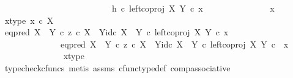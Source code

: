 \begin{isabellebody}
\ \ \ \ \ \ \ \ \ \ \ \ \ \ \ \ \ \ \ \ \ \ \ \ \ \ {\isacharparenleft}{\kern0pt}h\ {\isasymcirc}\isactrlsub c\ left{\isacharunderscore}{\kern0pt}coproj\ X\ Y{\isacharparenright}{\kern0pt}\ {\isasymcirc}\isactrlsub c\ x{\isachardoublequoteclose}\isanewline
\ \ \ \ \isamarkupfalse%
\ {\isacharminus}{\kern0pt}\ \isanewline
\ \ \ \ \ \ \isamarkupfalse%
\ x\isanewline
\ \ \ \ \ \ \isamarkupfalse%
\ x{\isacharunderscore}{\kern0pt}type{\isacharcolon}{\kern0pt}\ {\isachardoublequoteopen}x\ {\isasymin}\isactrlsub c\ X{\isachardoublequoteclose}\isanewline
\ \ \ \ \ \ \isamarkupfalse%
\ {\isachardoublequoteopen}{\isacharparenleft}{\kern0pt}{\isacharparenleft}{\kern0pt}eq{\isacharunderscore}{\kern0pt}pred\ {\isacharparenleft}{\kern0pt}X\ {\isasymCoprod}\ Y{\isacharparenright}{\kern0pt}\ {\isasymcirc}\isactrlsub c\ {\isasymlangle}z\ {\isasymcirc}\isactrlsub c\ {\isasymbeta}\isactrlbsub X\ {\isasymCoprod}\ Y\isactrlesub {\isacharcomma}{\kern0pt}id\isactrlsub c\ {\isacharparenleft}{\kern0pt}X\ {\isasymCoprod}\ Y{\isacharparenright}{\kern0pt}{\isasymrangle}{\isacharparenright}{\kern0pt}\ {\isasymcirc}\isactrlsub c\ left{\isacharunderscore}{\kern0pt}coproj\ X\ Y{\isacharparenright}{\kern0pt}\ {\isasymcirc}\isactrlsub c\ x\ {\isacharequal}{\kern0pt}\ \isanewline
\ \ \ \ \ \ \ \ \ \ \ \ \ \ eq{\isacharunderscore}{\kern0pt}pred\ {\isacharparenleft}{\kern0pt}X\ {\isasymCoprod}\ Y{\isacharparenright}{\kern0pt}\ {\isasymcirc}\isactrlsub c\ {\isasymlangle}z\ {\isasymcirc}\isactrlsub c\ {\isasymbeta}\isactrlbsub X\ {\isasymCoprod}\ Y\isactrlesub {\isacharcomma}{\kern0pt}id\isactrlsub c\ {\isacharparenleft}{\kern0pt}X\ {\isasymCoprod}\ Y{\isacharparenright}{\kern0pt}{\isasymrangle}\ {\isasymcirc}\isactrlsub c\ {\isacharparenleft}{\kern0pt}left{\isacharunderscore}{\kern0pt}coproj\ X\ Y\ {\isasymcirc}\isactrlsub c\ \ x{\isacharparenright}{\kern0pt}{\isachardoublequoteclose}\isanewline
\ \ \ \ \ \ \ \ \ \ \ \ \ \isamarkupfalse%
\ x{\isacharunderscore}{\kern0pt}type\ \isamarkupfalse%
\ {\isacharparenleft}{\kern0pt}typecheck{\isacharunderscore}{\kern0pt}cfuncs{\isacharcomma}{\kern0pt}\ metis\ assms\ cfunc{\isacharunderscore}{\kern0pt}type{\isacharunderscore}{\kern0pt}def\ comp{\isacharunderscore}{\kern0pt}associative{\isacharparenright}{\kern0pt}\isanewline
\ \ \ \ \ \ \isamarkupfalse%
\ \isamarkupfalse%
\ {\isachardoublequoteopen}{\isachardot}{\kern0pt}{\isachardot}{\kern0pt}{\isachardot}{\kern0pt}\ {\isacharequal}{\kern0pt}\ {\isasymf}{\isachardoublequoteclose}\isanewline

\end{isabellebody}
